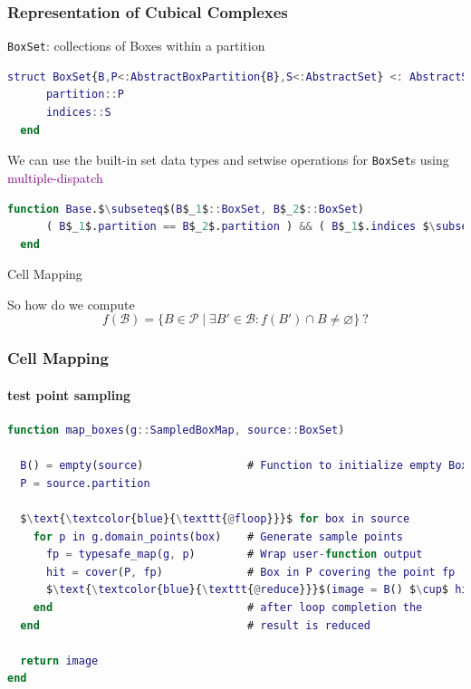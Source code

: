 \documentclass[
  english,            %
  aspectratio=169,    %
]{tumbeamer}
\newcommand{\cB}{\mathcal{B}}
\newcommand{\cP}{\mathcal{P}}
\renewcommand{\emph}[1]{\textcolor{purple}{#1}}
\begin{document}
\begin{frame}[fragile]
\frametitle{Representation of Cubical Complexes}

\texttt{BoxSet}: collections of Boxes within a partition

\begin{lstlisting}[language=Matlab,mathescape]
  struct BoxSet{B,P<:AbstractBoxPartition{B},S<:AbstractSet} <: AbstractSet{B}
      partition::P
      indices::S
  end
\end{lstlisting}

We can use the built-in set data types and setwise operations for \texttt{BoxSet}s using \emph{multiple-dispatch}

\begin{lstlisting}[language=Matlab,mathescape]
  function Base.$\subseteq$(B$_1$::BoxSet, B$_2$::BoxSet)
      ( B$_1$.partition == B$_2$.partition ) && ( B$_1$.indices $\subseteq$ B$_2$.indices )
  end
\end{lstlisting}

\end{frame}

\begin{frame}{Cell Mapping}

So how do we compute 
\[
  f(\cB) = \{ B\in\cP \mid \exists B'\in\cB: f(B')\cap B \neq \varnothing\}\ ?
\]

\begin{figure}
  \label{fig:boximage}
\end{figure}

\end{frame}

\begin{frame}[fragile]
\frametitle{Cell Mapping}
\framesubtitle{test point sampling}

\medskip

\begin{lstlisting}[language=Matlab,mathescape]
function map_boxes(g::SampledBoxMap, source::BoxSet)

  B() = empty(source)                # Function to initialize empty BoxSet
  P = source.partition

  $\text{\textcolor{blue}{\texttt{@floop}}}$ for box in source
    for p in g.domain_points(box)    # Generate sample points
      fp = typesafe_map(g, p)        # Wrap user-function output
      hit = cover(P, fp)             # Box in P covering the point fp
      $\text{\textcolor{blue}{\texttt{@reduce}}}$(image = B() $\cup$ hit) $\quad\ \ \,$   # Each thread collects hits,
    end                              # after loop completion the 
  end                                # result is reduced

  return image
end 
\end{lstlisting}

\end{frame}
\end{document}
